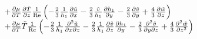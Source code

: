 \begin{equation*}
\begin{array}{l}
 \quad \; + \frac{{\partial \mu }}{{\partial T}}\frac{{\partial \tilde T}}{{\partial z}}\frac{1}{{{\mathop{\rm Re}\nolimits} }}\left( { - \frac{2}{3}\frac{1}{{h_1 }}\frac{{\partial \tilde u}}{{\partial x}} - \frac{2}{3}\frac{{\tilde v}}{{h_1 }}\frac{{\partial h_1 }}{{\partial y}} - \frac{2}{3}\frac{{\partial \tilde v}}{{\partial y}} + \frac{4}{3}\frac{{\partial \tilde w}}{{\partial z}}} \right) \\
 \quad \;{\rm{ + }}\frac{{\partial \mu }}{{\partial T}}\tilde T\frac{1}{{{\mathop{\rm Re}\nolimits} }}\left( { - \frac{2}{3}\frac{1}{{h_1 }}\frac{{\partial ^2 \tilde u}}{{\partial x\partial z}} - \frac{2}{3}\frac{1}{{h_1 }}\frac{{\partial \tilde v}}{{\partial z}}\frac{{\partial h_1 }}{{\partial y}} - \frac{2}{3}\frac{{\partial ^2 \tilde v}}{{\partial y\partial z}} + \frac{4}{3}\frac{{\partial ^2 \tilde w}}{{\partial z^2 }}} \right) \\
 \end{array}
\end{equation*}
